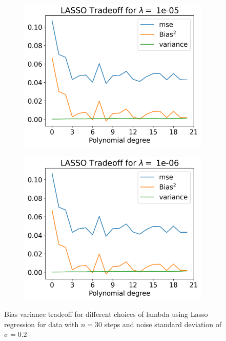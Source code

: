 \documentclass[12pt]{article}
\begin{document}
\begin{figure}[H]
\begin{subfigure}{.5\textwidth}
    \includegraphics[width=\textwidth]{../figures/tradeoff_LASSO_1e-0520.png}
    \caption{}
    \label{fig:l_1e-12}
  \end{subfigure}
  \begin{subfigure}{.5\textwidth}
    \centering
    \includegraphics[width=\textwidth]{../figures/tradeoff_LASSO_1e-0620.png}
    \caption{}
    \label{fig:l_1e-13}
  \end{subfigure}
  \caption{Bias variance tradeoff for different choices of lambda using Lasso regression for data with $n=30$ steps and noise standard deviation of $\sigma=0.2$}
  \label{fig:lasso_tradeoff}
\end{figure}
\end{document}
